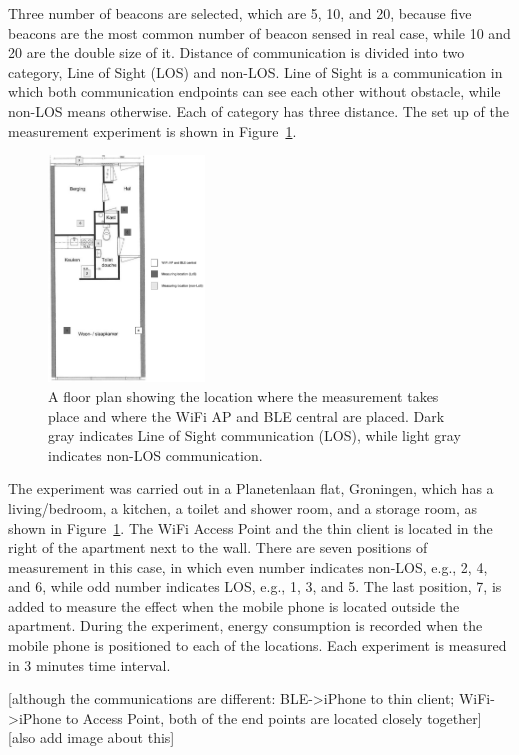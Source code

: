 \documentclass[journal]{vgtc}                %
\begin{document}
Three number of beacons are selected, which are 5, 10, and 20, because five beacons are the most common number of beacon sensed in real case, while 10 and 20 are the double size of it. Distance of communication is divided into two category, Line of Sight (LOS) and non-LOS. Line of Sight is a communication in which both communication endpoints can see each other without obstacle, while non-LOS means otherwise. Each of category has three distance. The set up of the measurement experiment is shown in Figure~\ref{fig:experiment-map}.

\begin{figure}
  \centering
    \includegraphics[width=0.37\textwidth]{experiment-map}
  \caption{A floor plan showing the location where the measurement takes place  and where the WiFi AP and BLE central are placed. Dark gray indicates Line of Sight communication (LOS), while light gray indicates non-LOS communication.}
  \label{fig:experiment-map}
\end{figure}

The experiment was carried out in a Planetenlaan flat, Groningen, which has a living/bedroom, a kitchen, a toilet and shower room, and a storage room, as shown in Figure~\ref{fig:experiment-map}. The WiFi Access Point and the thin client is located in the right of the apartment next to the wall. There are seven positions of measurement in this case, in which even number indicates non-LOS, e.g., 2, 4, and 6, while odd number indicates LOS, e.g., 1, 3, and 5. The last position, 7, is added to measure the effect when the mobile phone is located outside the apartment. During the experiment, energy consumption is recorded when the mobile phone is positioned to each of the locations. Each experiment is measured in 3 minutes time interval.

[although the communications are different: BLE->iPhone to thin client; WiFi->iPhone to Access Point, both of the end points are located closely together]
[also add image about this]
\end{document}
